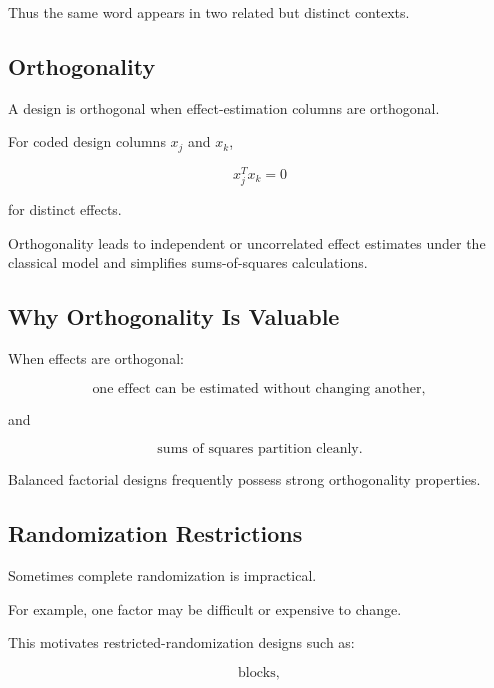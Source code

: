 Thus the same word appears in two related but distinct contexts.

\subsection{Orthogonality}
\label{subsec:orthogonality-design}

A design is orthogonal when effect-estimation columns are orthogonal.

For coded design columns \(x_j\) and \(x_k\),

\[
\boxed{
x_j^Tx_k=0
}
\]

for distinct effects.

Orthogonality leads to independent or uncorrelated effect estimates under
the classical model and simplifies sums-of-squares calculations.

\subsection{Why Orthogonality Is Valuable}
\label{subsec:why-orthogonality}

When effects are orthogonal:

\[
\boxed{
\text{one effect can be estimated without changing another},
}
\]

and

\[
\boxed{
\text{sums of squares partition cleanly}.
}
\]

Balanced factorial designs frequently possess strong orthogonality
properties.

\subsection{Randomization Restrictions}
\label{subsec:randomization-restrictions}

Sometimes complete randomization is impractical.

For example, one factor may be difficult or expensive to change.

This motivates restricted-randomization designs such as:

\[
\boxed{
\text{blocks},
}
\]

